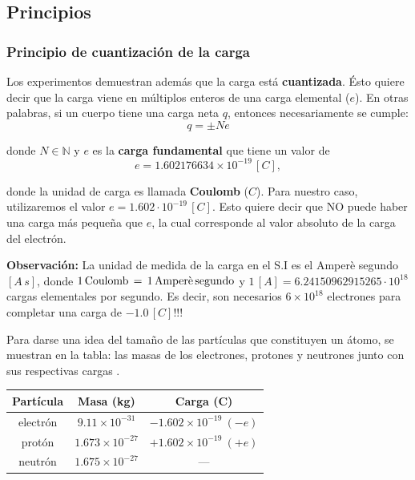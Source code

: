 \subsection{Principios}

\subsubsection{Principio de cuantización de la carga}

Los experimentos demuestran además que la carga está \textbf{cuantizada}. Ésto quiere decir que la carga viene en múltiplos enteros de una carga elemental ($e$). En otras palabras, si un cuerpo tiene una carga neta $q$, entonces necesariamente se cumple:
\begin{equation*}
\boxed{q = \pm N e}
\end{equation*}

donde $N \in \mathbb{N}$ y $e$ es la \textbf{carga fundamental} que tiene un valor de \cite{CODATA}
\begin{equation*}
e = 1.602 176 634 \times 10^{-19} \, [C],
\end{equation*}

donde la unidad de carga es llamada \textbf{Coulomb} ($C$). Para nuestro caso, utilizaremos el valor $e = 1.602 \cdot 10^{-19} \, [C]$. Esto quiere decir que NO puede haber una carga más pequeña que $e$, la cual corresponde al valor absoluto de la carga del electrón.

\textbf{Observación:} La unidad de medida de la carga en el S.I es el Amperè segundo $[A\,s]$, donde $1 \, \mbox{Coulomb} \, = \,1 \,\mbox{Amperè\,segundo}$ y $1 \,[A] = 6.24150962915265 \cdot 10^{18}$ cargas elementales por segundo. Es decir, son necesarios $6 \times 10^{18}$ electrones para completar una carga de $-1.0 \,[C]$!!!

Para darse una idea del tamaño de las partículas que constituyen un átomo, se muestran en la tabla: las masas de los electrones, protones y neutrones junto con sus respectivas cargas \cite{Alvarez}. 

\begin{center}
 \begin{tabular}{ccc}
 \hline
 Partícula & Masa (kg) & Carga (C) \\ \hline
 electrón &   $9.11 \times 10^{-31}$ & $- 1.602 \times 10^{-19} ~ (-e)$ \\
 protón & $1.673 \times 10^{-27}$ & $+ 1.602 \times 10^{-19} ~(+e)$ \\
 neutrón & $1.675 \times 10^{-27}$ &  --- \\
 \hline 
 \end{tabular}
\end{center}

